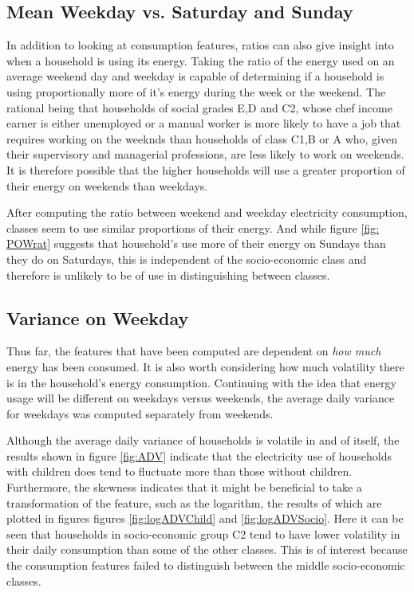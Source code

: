 \subsection*{Mean Weekday vs. Saturday and Sunday}
In addition to looking at consumption features, ratios can also give insight into when a household is using its energy. Taking the ratio of the energy used on an average weekend day and weekday is capable of determining if a household is using proportionally more of it's energy during the week or the weekend. The rational being that households of social grades E,D and C2, whose chef income earner is either unemployed or a manual worker is more likely to have a job that requires working on the weeknds than households of class C1,B or A who, given their supervisory and managerial professions, are less likely to work on weekends. It is therefore possible that the higher households will use a greater proportion of their energy on weekends than weekdays. 
\POWrat

After computing the ratio between weekend and weekday electricity consumption, classes seem to use similar proportions of their energy. And while figure \ref{fig: POWrat} suggests that household's use more of their energy on Sundays than they do on Saturdays, this is independent of the socio-economic class and therefore is unlikely to be of use in distinguishing between classes.


\subsection*{Variance on Weekday}
Thus far, the features that have been computed are dependent on \textit{how much} energy has been consumed. It is also worth considering how much volatility there is in the household's energy consumption. Continuing with the idea that energy usage will be different on weekdays versus weekends, the average daily variance for weekdays was computed separately from weekends. 

\ADV

Although the average daily variance of households is volatile in and of itself, the results shown in figure \ref{fig:ADV} indicate that the electricity use of households with children does tend to fluctuate more than those without children. Furthermore, the skewness indicates that it might be beneficial to take a transformation of the feature, such as the logarithm, the results of which are plotted in figures figures \ref{fig:logADVChild} and \ref{fig:logADVSocio}. Here it can be seen that households in socio-economic group C2 tend to have lower volatility in their daily consumption than some of the other classes. This is of interest because the consumption features failed to distinguish between the middle socio-economic classes.

